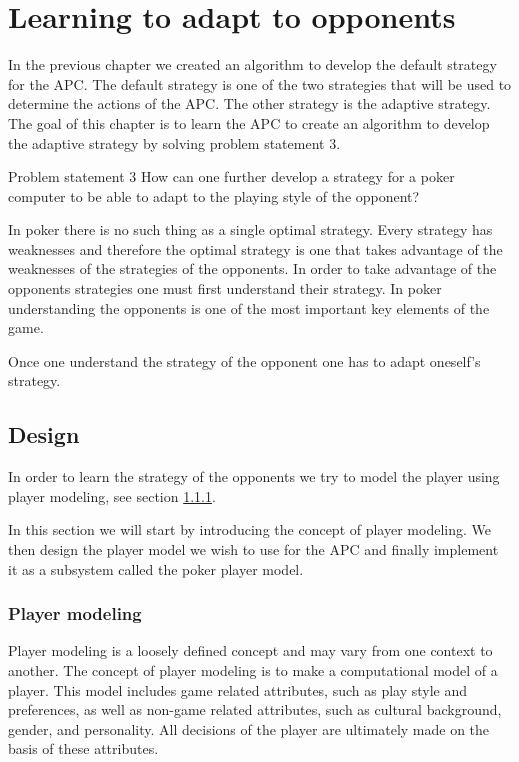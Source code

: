 \section{Learning to adapt to opponents}
\label{sec:part3}

In the previous chapter we created an algorithm to develop the default strategy for the APC. The default strategy is one of the two strategies that will be used to determine the actions of the APC. The other strategy is the adaptive strategy. \\

The goal of this chapter is to learn the APC to create an algorithm to develop the adaptive strategy by solving problem statement 3.

\vspace{4mm}
\begin{statementBox2}{Problem statement 3}
How can one further develop a strategy for a poker computer to be able to adapt to the playing style of the opponent?
\end{statementBox2}
\vspace{4mm} 

In poker there is no such thing as a single optimal strategy. Every strategy has weaknesses and therefore the optimal strategy is one that takes advantage of the weaknesses of the strategies of the opponents. In order to take advantage of the opponents strategies one must first understand their strategy. In poker understanding the opponents is one of the most important key elements of the game. 

Once one understand the strategy of the opponent one has to adapt oneself's strategy.

\subsection{Design}
In order to learn the strategy of the opponents we try to model the player using player modeling, see section \ref{sec:pm}. 

In this section we will start by introducing the concept of player modeling. We then design the player model we wish to use for the APC and finally implement it as a subsystem called the poker player model.


\subsubsection{Player modeling}
\label{sec:pm}
Player modeling is a loosely defined concept and may vary from one context to another. The concept of player modeling is to make a computational model of a player. This model includes game related attributes, such as play style and preferences, as well as non-game related attributes, such as cultural background, gender, and personality. All decisions of the player are ultimately made on the basis of these attributes. 

